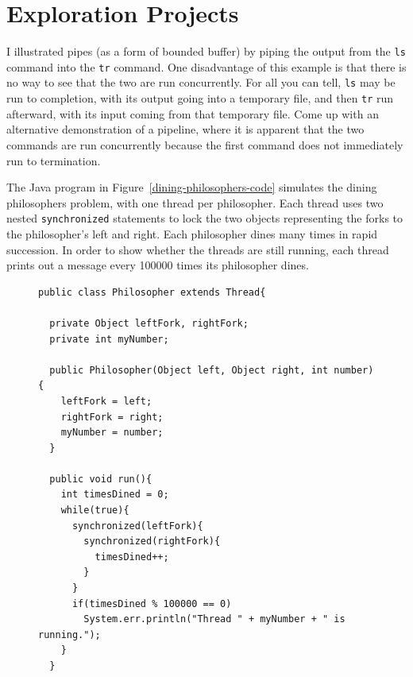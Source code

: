 \section*{Exploration Projects}
\begin{chapterEnumerate}
\item
I illustrated pipes (as a form of bounded buffer) by piping the
output from the \verb|ls| command into the \verb|tr| command.  One
disadvantage of this example is that there is no way to see that the
two are run concurrently.  For all you can tell, \verb|ls| may be run
to completion, with its output going into a temporary file, and then
\verb|tr| run afterward, with its input coming from that temporary
file.  Come up with an alternative demonstration of a pipeline, where
it is apparent that the two commands are run concurrently because the
first command does not immediately run to termination.
\item\label{dining-philosophers-project}
The Java program in Figure~\ref{dining-philosophers-code} simulates the
dining philosophers problem, with one thread per philosopher.  Each
thread uses two nested {\tt synchronized} statements to lock the two
objects representing the forks to the philosopher's left and right.
Each philosopher dines many times in rapid succession.  In order to
show whether the threads are still running, each thread prints out a
message every 100000 times its philosopher dines.  
\begin{figure}
\begin{verbatim}
public class Philosopher extends Thread{

  private Object leftFork, rightFork;
  private int myNumber;

  public Philosopher(Object left, Object right, int number){
    leftFork = left;
    rightFork = right;
    myNumber = number;
  }

  public void run(){
    int timesDined = 0;
    while(true){
      synchronized(leftFork){
        synchronized(rightFork){
          timesDined++;
        }
      }
      if(timesDined % 100000 == 0)
        System.err.println("Thread " + myNumber + " is running.");
    }
  }


\end{verbatim}
\end{figure}
\end{chapterEnumerate}
